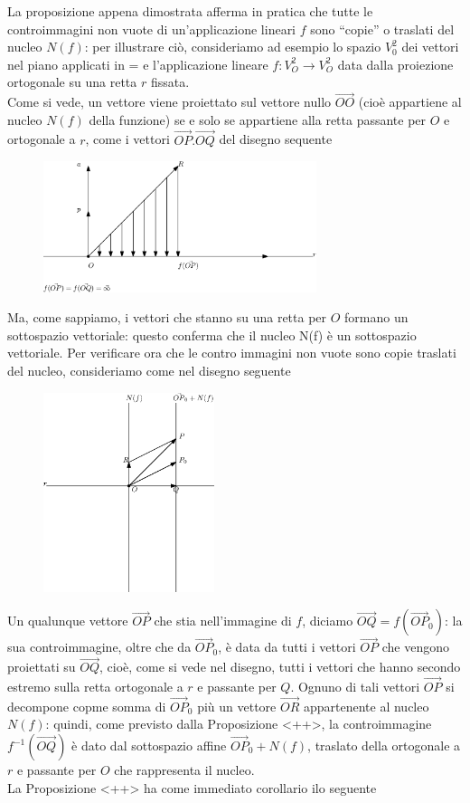 \documentclass{book}
\begin{document}
La proposizione appena dimostrata afferma in pratica che tutte le controimmagini non vuote
di un'applicazione lineari $f$ sono ``copie'' o traslati del nucleo $N(f)$: per illustrare ciò,
consideriamo ad esempio lo spazio $V_0^2$ dei vettori nel piano applicati in = e l'applicazione
lineare $f:V^2_O \to V^2_O$ data dalla proiezione ortogonale su una retta $r$ fissata.\\
Come si vede, un vettore viene proiettato sul vettore nullo $\vec{OO}$ (cioè appartiene al
nucleo $N(f)$ della funzione) se e solo se appartiene alla retta passante per $O$ e ortogonale
a $r$, come i vettori $\vec{OP}. \vec{OQ}$ del disegno sequente
\begin{figure}[th]
  \centering
  \includegraphics[width=8cm]{img/finiti/imgex4-4-5.eps}
\end{figure}

Ma, come sappiamo, i vettori che stanno su una retta per $O$ formano un sottospazio vettoriale:
questo conferma che il nucleo N(f) è un sottospazio vettoriale.
Per verificare ora che le contro immagini non vuote sono copie traslati del nucleo, consideriamo
come nel disegno seguente
\begin{figure}[th]
  \centering
  \includegraphics[width=5cm]{img/finiti/imgex4-4-6.eps}
\end{figure}

Un qualunque vettore $\vec{OP}$ che stia nell'immagine di $f$, diciamo $\vec{OQ}=f(\vec{OP}_0)$:
la sua controimmagine, oltre che da $\vec{OP}_0$, è data da tutti i vettori $\vec{OP}$ che
vengono proiettati su $\vec{OQ}$, cioè, come si vede nel disegno, tutti i vettori che hanno
secondo estremo sulla retta ortogonale a $r$ e passante per $Q$.
\clearpage
Ognuno di tali vettori $\vec{OP}$ si decompone copme somma di $\vec{OP}_0$ più un vettore
$\vec{OR}$ appartenente al nucleo $N(f)$: quindi, come previsto dalla Proposizione <++>, la
controimmagine $f^{-1}(\vec{OQ})$ è dato dal sottospazio affine $\vec{OP}_0+N(f)$, traslato
della ortogonale a $r$ e passante per $O$ che rappresenta il nucleo.\\
La Proposizione <++> ha come immediato corollario ilo seguente 
\end{document}
